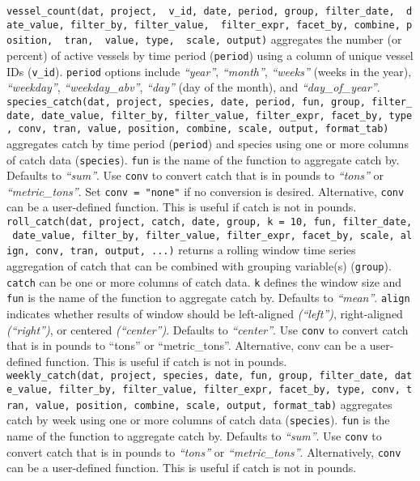 \documentclass[
]{article}
\begin{document}
\texttt{vessel\_count(dat,\ project,\ \ v\_id,\ date,\ period,\ group,\ filter\_date,\ \ date\_value,\ filter\_by,\ filter\_value,\ \ filter\_expr,\ facet\_by,\ combine,\ position,\ \ tran,\ \ value,\ type,\ \ scale,\ output)} aggregates the number (or percent) of active vessels by time period (\texttt{period}) using a column of unique vessel IDs (\texttt{v\_id}). \texttt{period} options include \emph{``year''}, \emph{``month''}, \emph{``weeks''} (weeks in the year), \emph{``weekday''}, \emph{``weekday\_abv''}, \emph{``day''} (day of the month), and \emph{``day\_of\_year''}.\\
\texttt{species\_catch(dat,\ project,\ species,\ date,\ period,\ fun,\ group,\ filter\_date,\ date\_value,\ filter\_by,\ filter\_value,\ filter\_expr,\ facet\_by,\ type,\ conv,\ tran,\ value,\ position,\ combine,\ scale,\ output,\ format\_tab)} aggregates catch by time period (\texttt{period}) and species using one or more columns of catch data (\texttt{species}). \texttt{fun} is the name of the function to aggregate catch by. Defaults to \emph{``sum''}. Use \texttt{conv} to convert catch that is in pounds to \emph{``tons''} or \emph{``metric\_tons''}. Set \texttt{conv\ =\ "none"} if no conversion is desired. Alternative, \texttt{conv} can be a user-defined function. This is useful if catch is not in pounds.\\
\texttt{roll\_catch(dat,\ project,\ catch,\ date,\ group,\ k\ =\ 10,\ fun,\ filter\_date,\ date\_value,\ filter\_by,\ filter\_value,\ filter\_expr,\ facet\_by,\ scale,\ align,\ conv,\ tran,\ output,\ ...)} returns a rolling window time series aggregation of catch that can be combined with grouping variable(s) (\texttt{group}). \texttt{catch} can be one or more columns of catch data. \texttt{k} defines the window size and \texttt{fun} is the name of the function to aggregate catch by. Defaults to \emph{``mean''}. \texttt{align} indicates whether results of window should be left-aligned \emph{(``left'')}, right-aligned \emph{(``right'')}, or centered \emph{(``center'')}. Defaults to \emph{``center''}. Use \texttt{conv} to convert catch that is in pounds to ``tons'' or ``metric\_tons''. Alternative, conv can be a user-defined function. This is useful if catch is not in pounds.\\
\texttt{weekly\_catch(dat,\ project,\ species,\ date,\ fun,\ group,\ filter\_date,\ date\_value,\ filter\_by,\ filter\_value,\ filter\_expr,\ facet\_by,\ type,\ conv,\ tran,\ value,\ position,\ combine,\ scale,\ output,\ format\_tab)} aggregates catch by week using one or more columns of catch data (\texttt{species}). \texttt{fun} is the name of the function to aggregate catch by. Defaults to \emph{``sum''}. Use \texttt{conv} to convert catch that is in pounds to \emph{``tons''} or \emph{``metric\_tons''}. Alternatively, \texttt{conv} can be a user-defined function. This is useful if catch is not in pounds.\\
\end{document}
